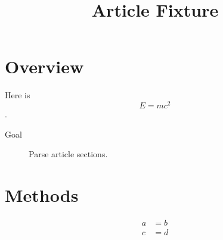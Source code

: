 \documentclass{article}
\title{Article Fixture}
\begin{document}
\section{Overview}
Here is \[ E = mc^2 \].
\begin{description}
\item[Goal] Parse article sections.
\end{description}
\section{Methods}
\begin{align*}
a &= b \\
c &= d
\end{align*}
\end{document}
